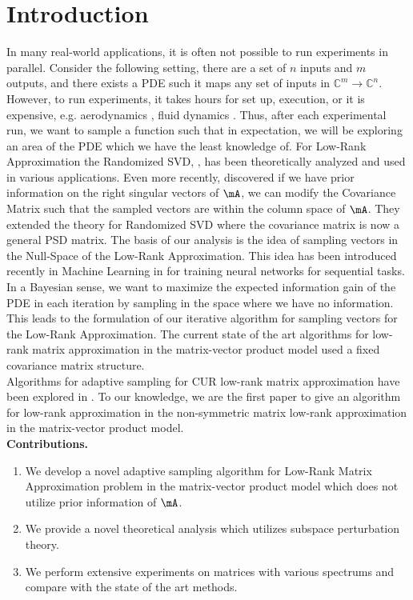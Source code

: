 \documentclass[10pt]{article}
\theoremstyle{plain}
\theoremstyle{definition}
\theoremstyle{remark}
\begin{document}
\section{Introduction}
In many real-world applications, it is often not possible to run experiments in parallel. Consider the following setting, there are a set of $n$ inputs and $m$ outputs, and there exists a PDE such it maps any set of inputs in $\mathbb{C}^{m} \to \mathbb{C}^{n}$. However, to run experiments, it takes hours for set up, execution, or it is expensive, e.g. aerodynamics \cite{fan:2005}, fluid dynamics \cite{lomax:2001}. Thus, after each experimental run, we want to sample a function such that in expectation, we will be exploring an area of the PDE which we have the least knowledge of. For Low-Rank Approximation the Randomized SVD, \cite{halko:2011}, has been theoretically analyzed and used in various applications. Even more recently, \cite{boulle:2022b} discovered if we have prior information on the right singular vectors of $\mA$, we can modify the Covariance Matrix such that the sampled vectors are within the column space of $\mA$. They extended the theory for Randomized SVD where the covariance matrix is now a general PSD matrix. The basis of our analysis is the idea of sampling vectors in the Null-Space of the Low-Rank Approximation. This idea has been introduced recently in Machine Learning in \cite{wang:2021} for training neural networks for sequential tasks. In a Bayesian sense, we want to maximize the expected information gain of the PDE in each iteration by sampling in the space where we have no information. This leads to the formulation of our iterative algorithm for sampling vectors for the Low-Rank Approximation. The current state of the art algorithms for low-rank matrix approximation in the matrix-vector product model used a fixed covariance matrix structure.\\
Algorithms for adaptive sampling for CUR low-rank matrix approximation have been explored in \cite{paul:2015}. To our knowledge, we are the first paper to give an algorithm for low-rank approximation in the non-symmetric matrix low-rank approximation in the matrix-vector product model.\\
{\bf Contributions.}
\begin{enumerate}
    \item 
    We develop a novel adaptive sampling algorithm for Low-Rank Matrix Approximation problem in the matrix-vector product model which does not utilize prior information of $\mA$.  
    \item 
    We provide a novel theoretical analysis which utilizes subspace perturbation theory.
    \item 
    We perform extensive experiments on matrices with various spectrums and compare with the state of the art methods. 
\end{enumerate}
\end{document}
